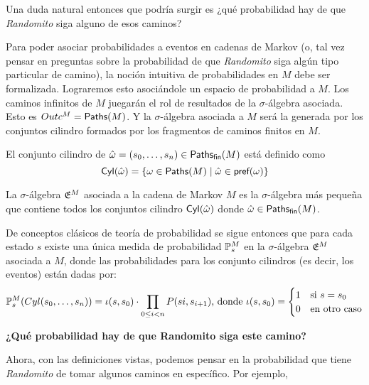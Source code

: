 Una duda natural entonces que podría surgir es ¿qué probabilidad hay de que
\emph{Randomito} siga alguno de esos caminos?

Para poder asociar probabilidades a eventos en cadenas de Markov (o, tal vez
pensar en preguntas sobre la probabilidad de que \emph{Randomito} siga algún
tipo particular de camino), la noción intuitiva de probabilidades en $M$ debe
ser formalizada. Lograremos esto asociándole un espacio de probabilidad a $M$.
Los caminos infinitos de $M$ juegarán el rol de resultados de la
$\sigma$-álgebra asociada. Esto es $Outc^M = \textsf{Paths}(M)$. Y la $\sigma$-álgebra
asociada a $M$ será la generada por los conjuntos cilindro formados por los
fragmentos de caminos finitos en $M$.

\begin{definition}
	El conjunto cilindro de $\hat \omega = (s_0, \dots, s_n) \in \textsf{Paths}_\textsf{fin}(M)$ está definido como
	$$\textsf{Cyl}(\hat \omega) = \{\omega \in \textsf{Paths}(M) \mid \hat \omega \in \textsf{pref}(\omega)\}$$
\end{definition}

\begin{definition}
	La $\sigma$-álgebra $\mathfrak{E}^M$ asociada a la cadena de Markov $M$ es la $\sigma$-álgebra más pequeña que contiene todos los conjuntos cilindro $\textsf{Cyl}(\hat \omega)$ donde $\hat \omega \in \textsf{Paths}_\textsf{fin}(M)$.
\end{definition}

De conceptos clásicos de teoría de probabilidad se sigue entonces que para cada
estado $s$ existe una única medida de probabilidad $\mathbb{P}^M_{s}$ en la
$\sigma$-álgebra $\mathfrak{E}^M$ asociada a $M$, donde las probabilidades para los
conjunto cilindros (es decir, los eventos) están dadas por:
\begin{equation}
	\label{probMC}
	\mathbb{P}^M_{s}(Cyl(s_0, \dots, s_n)) = \iota(s,s_0) \cdot \prod_{0 \leq i < n} P(si, s_{i+1})\text{, donde }\iota(s,s_0) =
	\begin{cases}
		1 &\text{si } s = s_0 \\
		0 &\text{en otro caso}
	\end{cases}
\end{equation}

\textbf{¿Qué probabilidad hay de que Randomito siga este camino?}

Ahora, con las definiciones vistas, podemos pensar en la probabilidad que tiene
\emph{Randomito} de tomar algunos caminos en específico. Por ejemplo,

